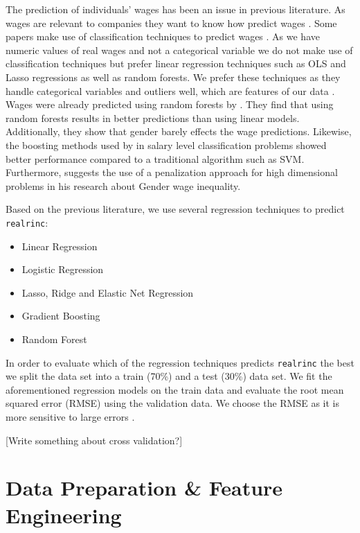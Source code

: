 \documentclass[11pt,a4paper]{article}
\begin{document}
The prediction of individuals' wages has been an issue in previous
literature. As wages are relevant to companies they want to know how
predict wages \autocite{Chakraborti}. Some papers make use of
classification techniques to predict wages \autocite{Chakraborti}. As we
have numeric values of real wages and not a categorical variable we do
not make use of classification techniques but prefer linear regression
techniques such as OLS and Lasso regressions as well as random forests.
We prefer these techniques as they handle categorical variables and
outliers well, which are features of our data \autocite{Cutler}. Wages
were already predicted using random forests by \autocite{Eichinger}.
They find that using random forests results in better predictions than
using linear models. Additionally, they show that gender barely effects
the wage predictions. Likewise, the boosting methods used by
\autocite{Chakrabarty2018} in salary level classification problems
showed better performance compared to a traditional algorithm such as
SVM. Furthermore, \autocite{BonaccoltoToepfer1612} suggests the use of a
penalization approach for high dimensional problems in his research
about Gender wage inequality.

Based on the previous literature, we use several regression techniques
to predict \texttt{realrinc}:

\begin{itemize}
\item
  Linear Regression
\item
  Logistic Regression
\item
  Lasso, Ridge and Elastic Net Regression
\item
  Gradient Boosting
\item
  Random Forest
\end{itemize}

In order to evaluate which of the regression techniques predicts
\texttt{realrinc} the best we split the data set into a train (70\%) and
a test (30\%) data set. We fit the aforementioned regression models on
the train data and evaluate the root mean squared error (RMSE) using the
validation data. We choose the RMSE as it is more sensitive to large
errors \autocite{Arour}.

{[}Write something about cross validation?{]}

\hypertarget{data-preparation-feature-engineering}{%
\section{Data Preparation \& Feature
Engineering}\label{data-preparation-feature-engineering}}
\end{document}
